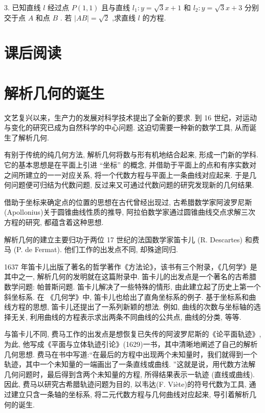 \documentclass[10pt]{article}
\begin{document}
3. 已知直线 \(l\) 经过点 \(P\left( {1,1}\right)\) 且与直线 \({l}_{1} : y = \sqrt{3}x + 1\) 和 \({l}_{2} : y = \sqrt{3}x + 3\) 分别交于点 \(A\) 和点 \(B\) . 若 \(\left| {AB}\right|  = \sqrt{2}\) ,求直线 \(l\) 的方程.

\section*{课后阅读}

\section*{解析几何的诞生}

文艺复兴以来，生产力的发展对科学技术提出了全新的要求. 到 16 世纪，对运动与变化的研究已成为自然科学的中心问题. 这迫切需要一种新的数学工具, 从而诞生了解析几何.

有别于传统的纯几何方法, 解析几何将数与形有机地结合起来, 形成一门新的学科. 它的基本思想是在平面上引进 “坐标” 的概念, 并借助于平面上的点和有序实数对之间所建立的一一对应关系, 将一个代数方程与平面上一条曲线对应起来. 于是几何问题便可归结为代数问题, 反过来又可通过代数问题的研究发现新的几何结果.

借助于坐标来确定点的位置的思想在古代曾经出现过, 古希腊数学家阿波罗尼斯 (Apollonius)关于圆锥曲线性质的推导, 阿拉伯数学家通过圆锥曲线交点求解三次方程的研究, 都蕴含着这种思想.

解析几何的建立主要归功于两位 17 世纪的法国数学家笛卡儿 (R. Descartes) 和费马 (P. de Fermat). 他们工作的出发点不同, 却殊途同归.

1637 年笛卡儿出版了著名的哲学著作《方法论》，该书有三个附录，《几何学》是其中之一, 解析几何的发明就在这篇附录中. 笛卡儿的出发点是一个著名的古希腊数学问题: 帕普斯问题. 笛卡儿解决了一些特殊的情形, 由此建立起了历史上第一个斜坐标系. 在 《几何学》中, 笛卡儿也给出了直角坐标系的例子. 基于坐标系和曲线方程的思想, 笛卡儿还提出了一系列新颖的想法. 例如, 曲线的次数与坐标轴的选择无关, 利用曲线的方程表示求出两条不同曲线的公共点, 曲线的分类, 等等.

与笛卡儿不同, 费马工作的出发点是想恢复已失传的阿波罗尼斯的《论平面轨迹》, 为此, 他写成《平面与立体轨迹引论》(1629)一书，其中清晰地阐述了自己的解析几何思想. 费马在书中写道:“在最后的方程中出现两个未知量时，我们就得到一个轨迹，其中一个未知量的一端画出了一条直线或曲线. ”这就是说，用代数方法解几何问题时，最后得到含两个未知量的方程, 所得结果表示一轨迹 (直线或曲线). 因此, 费马以研究古希腊轨迹问题为目的, 以韦达(F. Viète)的符号代数为工具, 通过建立只含一条轴的坐标系, 将二元代数方程与几何曲线对应起来, 导引着解析几何的诞生.
\end{document}
